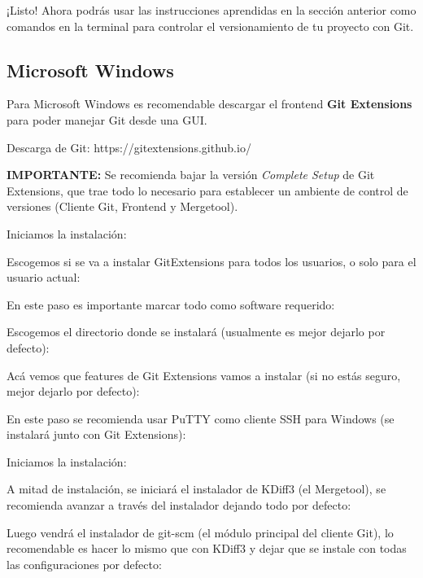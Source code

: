 \documentclass{article}
\begin{document}
¡Listo! Ahora podrás usar las instrucciones aprendidas en la sección anterior como comandos en la terminal para controlar el versionamiento de tu proyecto con Git.

\pagebreak

\subsection{Microsoft Windows}

Para Microsoft Windows es recomendable descargar el frontend \textbf{Git Extensions} para poder manejar Git desde una GUI.

Descarga de Git: \textsf{https://gitextensions.github.io/}

\noindent \textbf{IMPORTANTE:} Se recomienda bajar la versión \textit{Complete Setup} de Git Extensions, que trae todo lo necesario para establecer un ambiente de control de versiones (Cliente Git, Frontend y Mergetool\cite{kdiff}).

Iniciamos la instalación:

Escogemos si se va a instalar GitExtensions para todos los usuarios, o solo para el usuario actual:

En este paso es importante marcar todo como software requerido:

Escogemos el directorio donde se instalará (usualmente es mejor dejarlo por defecto):

Acá vemos que features de Git Extensions vamos a instalar (si no estás seguro, mejor dejarlo por defecto):

En este paso se recomienda usar PuTTY como cliente SSH para Windows (se instalará junto con Git Extensions):

Iniciamos la instalación:

A mitad de instalación, se iniciará el instalador de KDiff3 (el Mergetool), se recomienda avanzar a través del instalador dejando todo por defecto:

Luego vendrá el instalador de git-scm (el módulo principal del cliente Git), lo recomendable es hacer lo mismo que con KDiff3 y dejar que se instale con todas las configuraciones por defecto:
\end{document}
